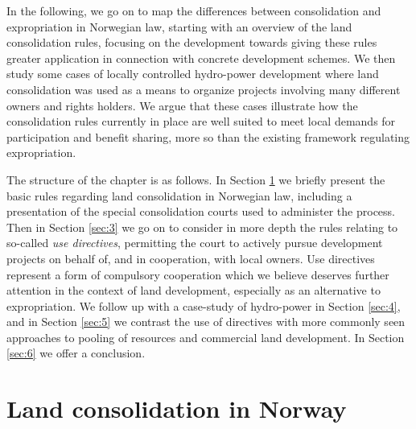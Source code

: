 \documentclass[10pt]{article} %
\begin{document}
In the following, we go on to map the differences between consolidation and expropriation in Norwegian law, starting with an overview of the land consolidation rules, focusing on the development towards giving these rules greater application in connection with concrete development schemes. We then study some cases of locally controlled hydro-power development where land consolidation was used as a means to organize projects involving many different owners and rights holders. We argue that these cases illustrate how the consolidation rules currently in place are well suited to meet local demands for participation and benefit sharing, more so than the existing framework regulating expropriation.

The structure of the chapter is as follows. In Section \ref{sec:2} we briefly present the basic rules regarding land consolidation in Norwegian law, including a presentation of the special consolidation courts used to administer the process. Then in Section \ref{sec:3} we go on to consider in more depth the rules relating to so-called \emph{use directives}, permitting the court to actively pursue development projects on behalf of, and in cooperation, with local owners. Use directives represent a form of compulsory cooperation which we believe deserves further attention in the context of land development, especially as an alternative to expropriation. We follow up with a case-study of hydro-power in Section \ref{sec:4}, and in Section \ref{sec:5} we contrast the use of directives with more commonly seen approaches to pooling of resources and commercial land development. In Section \ref{sec:6} we offer a conclusion.

\section{Land consolidation in Norway}\label{sec:2}
\end{document}
